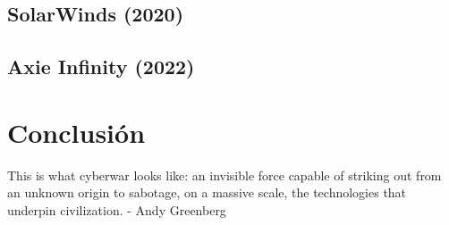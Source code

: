 \documentclass{article}
\begin{document}

\subsection{SolarWinds (2020)}

\subsection{Axie Infinity (2022)}

\section{Conclusión}
This is what cyberwar looks like: an invisible force capable of striking out from an unknown origin to sabotage, on a massive scale, the technologies that underpin civilization. - Andy Greenberg

\newpage
\printbibliography
\end{document}
